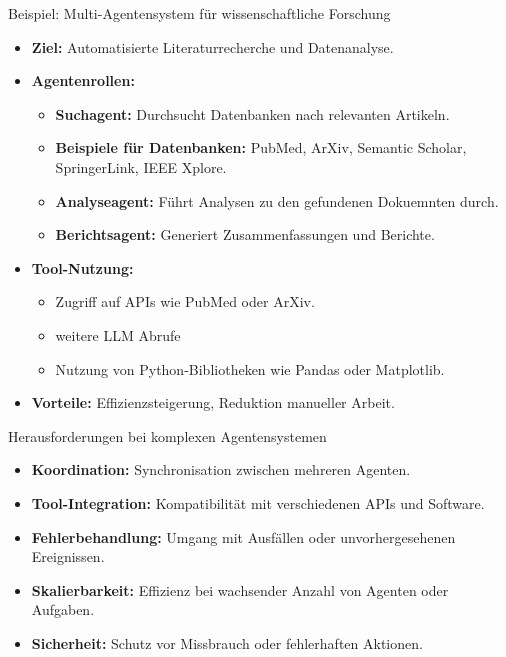 \documentclass[aspectratio=1610, xcolor=dvipsnames, 9pt]{beamer}
\begin{document}
\begin{frame}{Beispiel: Multi-Agentensystem für wissenschaftliche Forschung}
  \begin{itemize}
    \item \textbf{Ziel:} Automatisierte Literaturrecherche und Datenanalyse.
    \item \textbf{Agentenrollen:}
      \begin{itemize}
        \item \textbf{Suchagent:} Durchsucht Datenbanken nach relevanten Artikeln.
        \item \textbf{Beispiele für Datenbanken:} PubMed, ArXiv, Semantic Scholar, SpringerLink, IEEE Xplore.
        \item \textbf{Analyseagent:} Führt Analysen zu den gefundenen Dokuemnten durch.
        \item \textbf{Berichtsagent:} Generiert Zusammenfassungen und Berichte.
      \end{itemize}
    \item \textbf{Tool-Nutzung:}
      \begin{itemize}
        \item Zugriff auf APIs wie PubMed oder ArXiv.
        \item weitere LLM Abrufe
        \item Nutzung von Python-Bibliotheken wie Pandas oder Matplotlib.
      \end{itemize}
    \item \textbf{Vorteile:} Effizienzsteigerung, Reduktion manueller Arbeit.
  \end{itemize}
\end{frame}

\begin{frame}{Herausforderungen bei komplexen Agentensystemen}
  \begin{itemize}
    \item \textbf{Koordination:} Synchronisation zwischen mehreren Agenten.
    \item \textbf{Tool-Integration:} Kompatibilität mit verschiedenen APIs und Software.
    \item \textbf{Fehlerbehandlung:} Umgang mit Ausfällen oder unvorhergesehenen Ereignissen.
    \item \textbf{Skalierbarkeit:} Effizienz bei wachsender Anzahl von Agenten oder Aufgaben.
    \item \textbf{Sicherheit:} Schutz vor Missbrauch oder fehlerhaften Aktionen.
  \end{itemize}
\end{frame}
\end{document}
